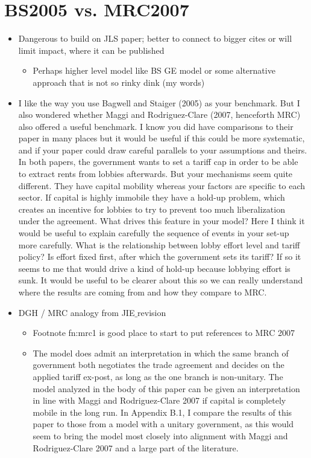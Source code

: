 \documentclass[12pt]{article}
\begin{document}
\section{BS2005 vs. MRC2007}
	\begin{itemize}
		\item Dangerous to build on JLS paper; better to connect to bigger cites or will limit impact, where it can be published
			\begin{itemize}
				\item Perhaps higher level model like BS GE model or some alternative approach that is not so rinky dink (my words)
			\end{itemize}
		\item I like the way you use Bagwell and Staiger (2005) as your benchmark.  But I also wondered whether Maggi and Rodriguez-Clare (2007, henceforth MRC) also offered a useful benchmark.  I know you did have comparisons to their paper in many places but it would be useful if this could be more systematic, and if your paper could draw careful parallels to your assumptions and theirs.  In both papers, the government wants to set a tariff cap in order to be able to extract rents from lobbies afterwards.  But your mechanisms seem quite different.  They have capital mobility whereas your factors are specific to each sector.  If capital is highly immobile they have a hold-up problem, which creates an incentive for lobbies to try to prevent too much liberalization under the agreement.  What drives this feature in your model?  Here I think it would be useful to explain carefully the sequence of events in your set-up more carefully.  What is the relationship between lobby effort level and tariff policy?  Is effort fixed first, after which the government sets its tariff?  If so it seems to me that would drive a kind of hold-up because lobbying effort is sunk.  It would be useful to be clearer about this so we can really understand where the results are coming from and how they compare to MRC. 
		\item DGH / MRC analogy from JIE$\_$revision
			\begin{itemize}
				\item Footnote fn:mrc1 is good place to start to put references to MRC 2007
				\item The model does admit an interpretation in which the same branch of government both negotiates the trade agreement and decides on the applied tariff ex-post, as long as the one branch is non-unitary. The model analyzed in the body of this paper can be given an interpretation in line with Maggi and Rodriguez-Clare 2007 if capital is completely mobile in the long run. In Appendix B.1, I compare the results of this paper to those from a model with a unitary government, as this would seem to bring the model most closely into alignment with Maggi and Rodriguez-Clare 2007 and a large part of the literature.

\end{itemize}
\end{itemize}
\end{document}
